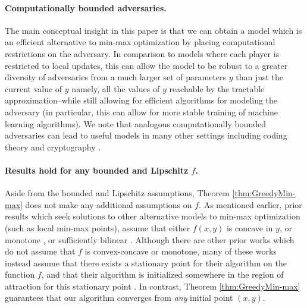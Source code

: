 \documentclass[11pt,letterpaper]{article}
\begin{document}
\paragraph{Computationally bounded adversaries.}  
 The main conceptual insight in this paper is that we can obtain a model which is an efficient alternative to min-max optimization by placing computational restrictions on the adversary. %
%
In comparison to models where each player is restricted to local updates, this can allow the model to be robust to a greater diversity of adversaries from a much larger set of parameters $y$ than just the current value of $y$ namely, all the values of $y$ reachable by the tractable approximation--while still allowing for efficient algorithms for modeling the adversary (in particular, this can allow for more stable training of machine  learning algorithms).
%
%
We note that analogous computationally bounded adversaries can lead to useful models in many other settings including coding theory  \cite{lipton1994new, micali2005optimal, 5671339} and cryptography \cite{goldwasser1984probabilistic, canetti2000security}.
%

\vspace{-3mm}
\paragraph{Results hold for any bounded and Lipschitz $f$.}  Aside from the bounded and Lipschitz assumptions, Theorem \ref{thm:GreedyMin-max} does not make any additional assumptions on $f$. 
%
As mentioned earlier, prior results which seek solutions to other alternative models to min-max optimization (such as local min-max points), assume that either $f(x,y)$ is concave  \cite{thekumparampil2019efficient, rafique2018non} in $y$, or monotone \cite{lin2018solving, gidel2018variational}, or sufficiently bilinear \cite{abernethy2019last}.
  Although there are other prior works which do not assume that $f$ is convex-concave or monotone, many of these works instead assume that there exists a stationary point for their algorithm on the function $f$, and that their algorithm is initialized somewhere in the region of attraction for this stationary point \cite{heusel2017gans, adolphs2018local, wang2020ridge, mazumdar2019finding}. 
  In contrast, Theorem \ref{thm:GreedyMin-max} guarantees that our algorithm  converges from {\em any} initial point $(x,y).$

\vspace{-3mm}
\end{document}
